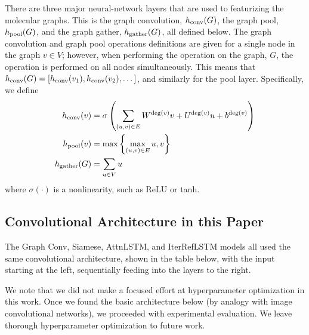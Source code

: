 There are three major neural-network layers that are used to featurizing the molecular graphs. This is the graph convolution, $h_{\rm conv}(G)$, the graph pool, $h_{\rm pool}(G)$, and the graph gather, $h_{\rm gather}(G)$, all defined below. The graph convolution and graph pool operations definitions are given for a single node in the graph $v\in V$; however, when performing the operation on the graph, $G$, the operation is performed on all nodes simultaneously. This means that $h_{\rm conv}(G) = [h_{\rm conv}(v_1), h_{\rm conv}(v_2),\dots]$, and similarly for the pool layer. Specifically, we define
\begin{align*}
h_{\rm{conv}}(v) &= \sigma\left(\sum\limits_{(u,v)\in E} W^{{\rm{deg}}(v)}v + U^{{\rm{deg}}(v)}u + b^{{\rm{deg}}(v)}\right) \\
h_{\rm{pool}}(v) &= \max\left\{\max\limits_{(u,v)\in E} u, v\right \} \\
h_{\rm{gather}}(G) &= \sum_{u\in V} u\\
\end{align*}
where $\sigma(\cdot)$ is a nonlinearity, such as ReLU or tanh.

\subsection{Convolutional Architecture in this Paper}

The Graph Conv, Siamese, AttnLSTM, and IterRefLSTM models all used the same convolutional architecture, shown in the table below, with the input starting at the left, sequentially feeding into the layers to the right.

We note that we did not make a focused effort at hyperparameter optimization in this work. Once we found the basic architecture below (by analogy with image convolutional networks), we proceeded with experimental evaluation. We leave thorough hyperparameter optimization to future work.

